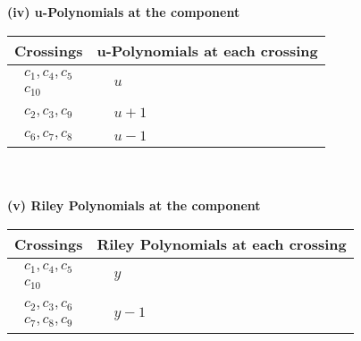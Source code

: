 \documentclass[1p]{elsarticle_modified}
\theoremstyle{definition}
\begin{document}
\newpage\renewcommand{\arraystretch}{1}
\flushleft \textbf{(iv) u-Polynomials at the component}\newline \\
\begin{tabular}{m{50pt}|m{274pt}}
Crossings & \hspace{64pt}u-Polynomials at each crossing \\
\hline $$\begin{aligned}c_{1},c_{4},c_{5}\\c_{10}\end{aligned}$$&$\begin{aligned}
&u
\end{aligned}$\\
\hline $$\begin{aligned}c_{2},c_{3},c_{9}\end{aligned}$$&$\begin{aligned}
&u+1
\end{aligned}$\\
\hline $$\begin{aligned}c_{6},c_{7},c_{8}\end{aligned}$$&$\begin{aligned}
&u-1
\end{aligned}$\\
\hline
\end{tabular}\\~\\
\newpage\renewcommand{\arraystretch}{1}
\flushleft \textbf{(v) Riley Polynomials at the component}\newline \\
\begin{tabular}{m{50pt}|m{274pt}}
Crossings & \hspace{64pt}Riley Polynomials at each crossing \\
\hline $$\begin{aligned}c_{1},c_{4},c_{5}\\c_{10}\end{aligned}$$&$\begin{aligned}
&y
\end{aligned}$\\
\hline $$\begin{aligned}c_{2},c_{3},c_{6}\\c_{7},c_{8},c_{9}\end{aligned}$$&$\begin{aligned}
&y-1
\end{aligned}$\\
\hline
\end{tabular}\\~\\
\end{document}
